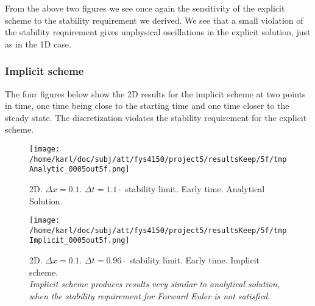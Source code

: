 \documentclass{article}
\begin{document}
From the above two figures we see once again the sensitivity of the explicit scheme to the stability requirement we derived. We see that a small violation of the stability requirement gives unphysical oscillations in the explicit solution, just as in the 1D case.

\subsubsection{Implicit scheme}
The four figures below show the 2D results for the implicit scheme at two points in time, one time being close to the starting time and one time closer to the steady state. The discretization violates the stability requirement for the explicit scheme.

\begin{minipage}{.45\textwidth} 
	\begin{figure}[H]
		\centering
		\texttt{[image: /home/karl/doc/subj/att/fys4150/project5/resultsKeep/5f/tmpAnalytic\_0005out5f.png]}
		\caption{2D. $\Delta x = 0.1$. $\Delta t = 1.1 \cdot$ stability limit. Early time. Analytical Solution. \\ \textit{}}
		\label{fig:fig2d1}
	\end{figure}
\end{minipage}\hfill
\begin{minipage}{.45\textwidth} 
	\begin{figure}[H]
		\centering
		\texttt{[image: /home/karl/doc/subj/att/fys4150/project5/resultsKeep/5f/tmpImplicit\_0005out5f.png]}
		\caption{2D. $\Delta x = 0.1$. $\Delta t = 0.96 \cdot$ stability limit. Early time. Implicit scheme.\\ \textit{Implicit scheme produces results very similar to analytical solution, when the stability requirement for Forward Euler is not satisfied.}}
		\label{fig:fig2d2}
	\end{figure}
\end{minipage}\hfill
\vspace{2ex}
\end{document}
